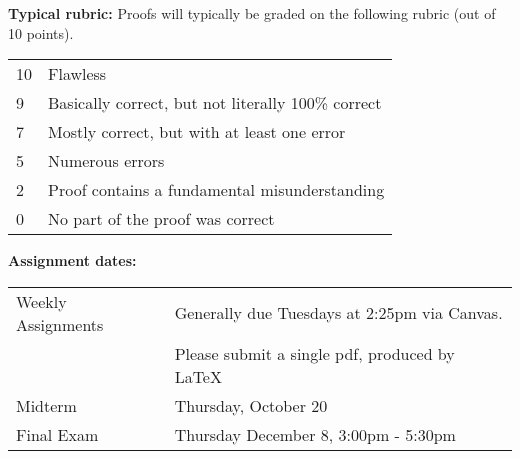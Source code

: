 \documentclass[12pt]{article}
\begin{document}
\newpage
\vspace*{.15in}
\noindent\textbf{Typical rubric:} 
Proofs will typically be graded on the following rubric (out of 10 points).

\begin{center}
  \begin{tabular}{|l|l|}
    \hline
    10& Flawless\\
    9& Basically correct, but not literally 100\% correct\\
    7& Mostly correct, but with at least one error\\    
    5& Numerous errors\\
    2& Proof contains a fundamental misunderstanding\\
    0& No part of the proof was correct\\
    \hline
  \end{tabular}
\end{center}



\noindent\textbf{Assignment dates:}

\begin{center}
  \begin{tabular}{|l|l|}
    \hline
    Weekly Assignments & Generally due Tuesdays at 2:25pm via Canvas.\\
                       & Please submit a single pdf, produced by LaTeX\\
    \hline
    Midterm  & Thursday, October 20 \\     
    Final Exam  & Thursday December 8, 3:00pm - 5:30pm	 \\
    \hline
  \end{tabular}
\end{center}





\end{document}
